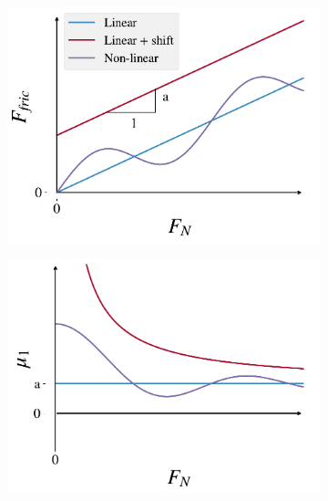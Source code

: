 

\begin{figure}[H]
  \centering
  \begin{subfigure}[t]{0.32\textwidth}
      \centering
      \includegraphics[width=\textwidth]{figures/theory/fric_coef_example_a.pdf}
      \caption{}
  \end{subfigure}
  \hfill
  \begin{subfigure}[t]{0.32\textwidth}
      \centering
      \includegraphics[width=\textwidth]{figures/theory/fric_coef_example_b.pdf}

\end{subfigure}
\end{figure}
